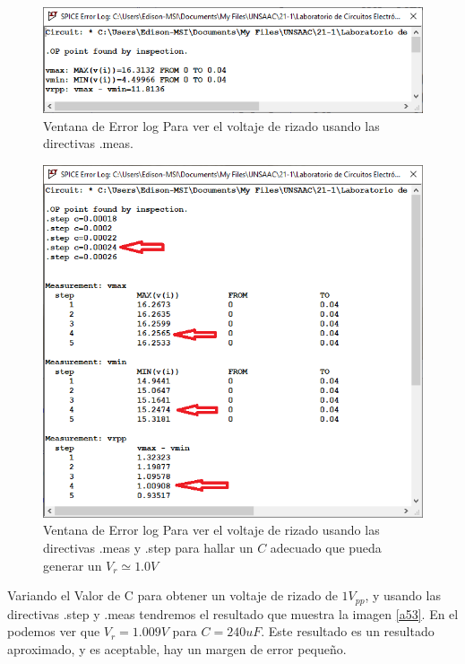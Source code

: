 \documentclass[a4paper]{IEEEtran} %
\begin{document}
\begin{figure}[h!]
	\centering
	\includegraphics[scale=0.5]{IMAGENES/a52}
	\caption{Ventana de Error log Para ver el voltaje de rizado usando las directivas .meas.}
	\label{a52}
\end{figure}



\begin{figure}[h!]
	\centering
	\includegraphics[scale=0.5]{IMAGENES/a53}
	\caption{Ventana de Error log Para ver el voltaje de rizado usando las directivas .meas y .step para hallar un $C$ adecuado que pueda generar un $V_r \simeq 1.0V$}
	\label{a53}
\end{figure}

Variando el Valor de C para obtener un voltaje de rizado de $1V_{pp}$, y usando las directivas .step y .meas tendremos el resultado que muestra la imagen \eqref{a53}. En el podemos ver que $V_r = 1.009V$ para $C = 240uF$. Este resultado es un resultado aproximado, y es aceptable, hay un margen de error pequeño.
\end{document}
